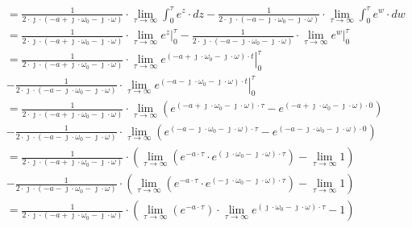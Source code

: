\begin{task}
\begin{align*}
&=\frac{1}{2 \cdot \jmath \cdot (-a + \jmath \cdot \omega_{0} -\jmath \cdot \omega)} \cdot \lim_{\tau \rightarrow \infty }
\int_{0}^{\tau} e^{z} \cdot dz
-\frac{1}{2 \cdot \jmath \cdot (-a - \jmath \cdot \omega_{0} -\jmath \cdot \omega)} \cdot \lim_{\tau \rightarrow \infty }
\int_{0}^{\tau} e^{w} \cdot dw\\
&=\frac{1}{2 \cdot \jmath \cdot (-a + \jmath \cdot \omega_{0} -\jmath \cdot \omega)} \cdot \lim_{\tau \rightarrow \infty }
\left. e^{z}\right|_{0}^{\tau}
-\frac{1}{2 \cdot \jmath \cdot (-a - \jmath \cdot \omega_{0} -\jmath \cdot \omega)} \cdot \lim_{\tau \rightarrow \infty }
\left. e^{w}\right|_{0}^{\tau}\\
&=\frac{1}{2 \cdot \jmath \cdot (-a + \jmath \cdot \omega_{0} -\jmath \cdot \omega)} \cdot \lim_{\tau \rightarrow \infty }
\left. e^{(-a + \jmath \cdot \omega_{0} -\jmath \cdot \omega) \cdot t}\right|_{0}^{\tau}\\
&-\frac{1}{2 \cdot \jmath \cdot (-a - \jmath \cdot \omega_{0} -\jmath \cdot \omega)} \cdot \lim_{\tau \rightarrow \infty }
\left. e^{(-a - \jmath \cdot \omega_{0} -\jmath \cdot \omega) \cdot t}\right|_{0}^{\tau}\\
&=\frac{1}{2 \cdot \jmath \cdot (-a + \jmath \cdot \omega_{0} -\jmath \cdot \omega)} \cdot \lim_{\tau \rightarrow \infty }
\left( e^{(-a + \jmath \cdot \omega_{0} -\jmath \cdot \omega) \cdot \tau}-e^{(-a + \jmath \cdot \omega_{0} -\jmath \cdot \omega) \cdot 0} \right)\\
&-\frac{1}{2 \cdot \jmath \cdot (-a - \jmath \cdot \omega_{0} -\jmath \cdot \omega)} \cdot \lim_{\tau \rightarrow \infty }
\left( e^{(-a - \jmath \cdot \omega_{0} -\jmath \cdot \omega) \cdot \tau}-e^{(-a - \jmath \cdot \omega_{0} -\jmath \cdot \omega) \cdot 0} \right)\\
&=\frac{1}{2 \cdot \jmath \cdot (-a + \jmath \cdot \omega_{0} -\jmath \cdot \omega)} \cdot \left(\lim_{\tau \rightarrow \infty }
\left( e^{-a \cdot \tau} \cdot e^{(\jmath \cdot \omega_{0} -\jmath \cdot \omega) \cdot \tau} \right)-\lim_{\tau \rightarrow \infty }1\right)\\
&-\frac{1}{2 \cdot \jmath \cdot (-a - \jmath \cdot \omega_{0} -\jmath \cdot \omega)} \cdot \left(\lim_{\tau \rightarrow \infty }
\left( e^{-a \cdot \tau} \cdot e^{(-\jmath \cdot \omega_{0} -\jmath \cdot \omega) \cdot \tau} \right)-\lim_{\tau \rightarrow \infty }1\right)\\
&=\frac{1}{2 \cdot \jmath \cdot (-a + \jmath \cdot \omega_{0} -\jmath \cdot \omega)} \cdot \left(\lim_{\tau \rightarrow \infty }
( e^{-a \cdot \tau})\cdot \lim_{\tau \rightarrow \infty } e^{(\jmath \cdot \omega_{0} -\jmath \cdot \omega) \cdot \tau}-1\right)\\

\end{align*}
\end{task}
